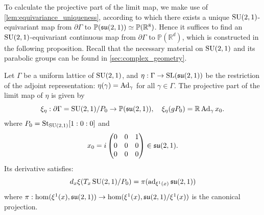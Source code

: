 \documentclass{report}
\begin{document}
To calculate the projective part of the limit map, we make use of \cref{lem:equivariance_uniqueness}, according to which there exists a unique $\operatorname{{\mathrm{SU}}}(2,1)$-equivariant map from $\partial \Gamma$ to $\mathbb P (\operatorname{{\mathfrak{su}}}(2,1)) \simeq \mathbb P(\mathbb R^8)$.
Hence it suffices to find an $\operatorname{{\mathrm{SU}}}(2,1)$-equivariant continuous map from $\partial \Gamma$ to $\mathbb P(\mathbb R^d)$, which is constructed in the following proposition.
Recall that the necessary material on $\operatorname{{\mathrm{SU}}}(2,1)$ and its parabolic groups can be found in \cref{sec:complex_geometry}.
\begin{proposition}\label{prop:counterexample_limit_map}
    Let $\Gamma$ be a uniform lattice of $\operatorname{{\mathrm{SU}}}(2,1)$, and $\eta: \Gamma \to \operatorname{{\mathrm{SL}}}(\mathfrak{su}(2,1))$ be the restriction of the adjoint representation: $\eta(\gamma) = \operatorname{Ad}_{\gamma}$ for all $\gamma \in \Gamma$.
    The projective part of the limit map of $\eta$ is given by
    \[
        \xi_\eta: \partial \Gamma = \operatorname{{\mathrm{SU}}}(2,1)/P_0 \to \mathbb P(\mathfrak{su}(2,1)), \quad \xi_\eta(g P_0) = \mathbb R \operatorname{Ad}_{\gamma} x_0.
    \]
    where  $P_0 = \mathrm{St}_{\operatorname{{\mathrm{SU}}}(2,1)} [1:0:0]$ and 
    \[
    x_0 = i \begin{pmatrix} 0 & 0 & 1 \\ 0 & 0 & 0 \\ 0 & 0 & 0 \end{pmatrix} \in \operatorname{{\mathfrak{su}}}(2,1).
    \]
    Its derivative satisfies: 
    \[
    d_x \xi(T_x \operatorname{{\mathrm{SU}}}(2,1)/P_0) = \pi(\operatorname{ad}_{\xi^1(x)} \operatorname{{\mathfrak{su}}}(2,1))
    \]
    where $\pi : \hom (\xi^1(x), \operatorname{{\mathfrak{su}}}(2,1)) \to \hom(\xi^1(x), \operatorname{{\mathfrak{su}}}(2,1)/ \xi^1(x))$ is the canonical projection.
\end{proposition}
\end{document}
